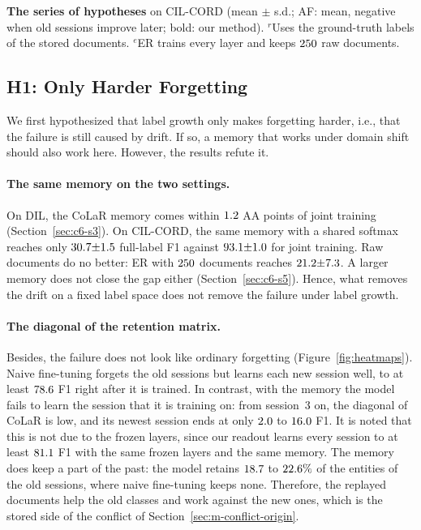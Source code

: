 \begin{table}[!htbp]
  \centering
  \caption[The series of hypotheses on CIL-CORD]{\textbf{The series of hypotheses} on
  CIL-CORD (mean $\pm$ s.d.; AF: mean, negative when old sessions improve later; bold: our
  method). $^{r}$Uses the ground-truth labels of the stored documents. $^{e}$ER trains
  every layer and keeps $\nErCilBuf$ raw documents.}
  \label{tab:ladder}
  \resizebox{\textwidth}{!}{\begin{minipage}{21.6cm}\setlength{\textwidth}{21.6cm}\footnotesize\setlength{\tabcolsep}{3pt}\end{minipage}}
\end{table}

\subsection{H1: Only Harder Forgetting}
\label{sec:r-h1}

We first hypothesized that label growth only makes forgetting harder, i.e., that the
failure is still caused by drift. If so, a memory that works under domain shift should also
work here. However, the results refute it.

\paragraph{The same memory on the two settings.} On DIL, the CoLaR memory comes within
$1.2$ AA points of joint training (Section~\ref{sec:c6-s3}). On CIL-CORD, the
same memory with a shared softmax reaches only $30.7{\pm}1.5$ full-label F1 against
$93.1{\pm}1.0$ for joint training. Raw documents do no better: ER with $\nErCilBuf$
documents reaches $21.2{\pm}7.3$. A larger memory does not close the gap either
(Section~\ref{sec:c6-s5}). Hence, what removes the drift on a fixed label space does not
remove the failure under label growth.

\paragraph{The diagonal of the retention matrix.} Besides, the failure does not look like
ordinary forgetting (Figure~\ref{fig:heatmaps}). Naive fine-tuning forgets the old sessions
but learns each new session well, to at least $78.6$ F1 right after it is
trained. In contrast, with the memory the model fails to learn the session that it is
training on: from session~3 on, the diagonal of CoLaR is low, and its newest session ends
at only $2.0$ to $16.0$ F1. It is noted that this is not due to the
frozen layers, since our readout learns every session to at least $81.1$ F1 with
the same frozen layers and the same memory. The memory does keep a part of the past: the
model retains $18.7$ to $22.6\%$ of the entities of the old sessions, where
naive fine-tuning keeps none. Therefore, the replayed documents help the old classes and
work against the new ones, which is the stored side of the conflict of
Section~\ref{sec:m-conflict-origin}.

